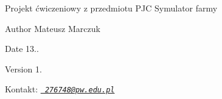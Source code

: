 \begin{DoxyParagraph}{Projekt ćwiczeniowy z przedmiotu P\+JC}
Symulator farmy 
\end{DoxyParagraph}
\begin{DoxyAuthor}{Author}
Mateusz Marczuk 
\end{DoxyAuthor}
\begin{DoxyDate}{Date}
13.. 
\end{DoxyDate}
\begin{DoxyVersion}{Version}
1. 
\end{DoxyVersion}
\begin{DoxyParagraph}{Kontakt\+:}
{\itshape \href{mailto:276748@pw.edu.pl}\texttt{ 276748@pw.\+edu.\+pl}} 
\end{DoxyParagraph}

